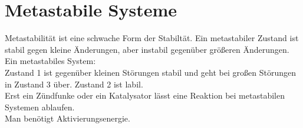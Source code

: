 \section{Metastabile Systeme} \label{sec:metastabile_systeme}
Metastabilität ist eine schwache Form der Stabiltät. 
Ein metastabiler Zustand ist stabil gegen kleine Änderungen, 
aber instabil gegenüber größeren Änderungen. \\
Ein metastabiles System:  \\
Zustand 1 ist gegenüber kleinen Störungen stabil und geht bei großen Störungen in Zustand 3 über. Zustand 2 ist labil. \\
Erst ein Zündfunke oder ein Katalysator lässt eine Reaktion bei metastabilen Systemen ablaufen. \\
Man benötigt Aktivierungsenergie.
